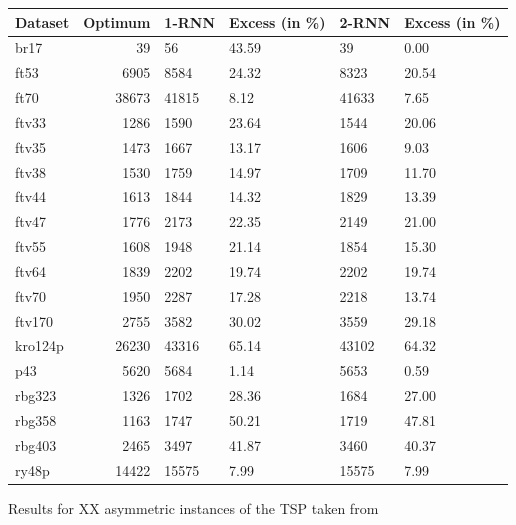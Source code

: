 \begin{figure}[ht]
	\centering
	\begin{minipage}{\linewidth}
		\centering
		\begin{tabular*}{\textwidth}{l||r|| l | l || l | l }
			Dataset & Optimum & 1-RNN & Excess (in \%) & 2-RNN & Excess (in \%) \\
			\hline\hline
			br17    & 39    & 56    & 43.59 & 39    & 0.00  \\
			ft53    & 6905  & 8584  & 24.32 & 8323  & 20.54 \\
			ft70    & 38673 & 41815 & 8.12  & 41633 & 7.65  \\
			ftv33   & 1286  & 1590  & 23.64 & 1544  & 20.06 \\
			ftv35   & 1473  & 1667  & 13.17 & 1606  & 9.03  \\
			ftv38   & 1530  & 1759  & 14.97 & 1709  & 11.70 \\
			ftv44   & 1613  & 1844  & 14.32 & 1829  & 13.39 \\
			ftv47   & 1776  & 2173  & 22.35 & 2149  & 21.00 \\
			ftv55   & 1608  & 1948  & 21.14 & 1854  & 15.30 \\
			ftv64   & 1839  & 2202  & 19.74 & 2202  & 19.74 \\
			ftv70   & 1950  & 2287  & 17.28 & 2218  & 13.74 \\
			ftv170  & 2755  & 3582  & 30.02 & 3559  & 29.18 \\
			kro124p & 26230 & 43316 & 65.14 & 43102 & 64.32 \\
			p43     & 5620  & 5684  & 1.14  & 5653  & 0.59  \\
			rbg323  & 1326  & 1702  & 28.36 & 1684  & 27.00 \\
			rbg358  & 1163  & 1747  & 50.21 & 1719  & 47.81 \\
			rbg403  & 2465  & 3497  & 41.87 & 3460  & 40.37 \\
			ry48p   & 14422 & 15575 & 7.99  & 15575 & 7.99  \\
		\end{tabular*}
	\end{minipage}
	
	\caption{Results for XX asymmetric instances of the TSP taken from \cite{REINELT1995}}
	\label{fig:table}
\end{figure}